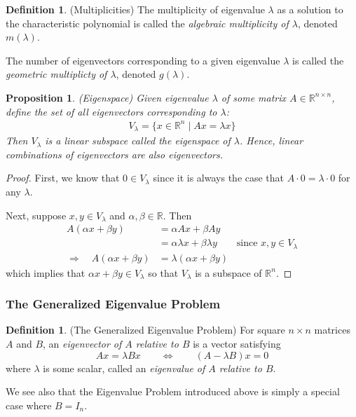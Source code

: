 \documentclass[12pt]{article}
\numberwithin{equation}{section} %
\theoremstyle{plain}
\newtheorem{prop}[thm]{Proposition}
\theoremstyle{definition}
\newtheorem{defn}[thm]{Definition}
\theoremstyle{remark}
\newcommand{\R}{\mathbb{R}}
\newcommand{\Rn}{\mathbb{R}^n}
\newcommand{\Rnn}{\mathbb{R}^{n\times n}}
\begin{document}
\begin{defn}{(Multiplicities)}
The multiplicity of eigenvalue $\lambda$ as a solution to the
characteristic polynomial is called the \emph{algebraic multiplicity of
$\lambda$}, denoted $m(\lambda)$.

The number of eigenvectors corresponding to a given eigenvalue $\lambda$
is called the \emph{geometric multiplicty of $\lambda$}, denoted
$g(\lambda)$.
\end{defn}

\begin{prop}{\emph{(Eigenspace)}}
Given eigenvalue $\lambda$ of some matrix $A\in\Rnn$, define the set of
all eigenvectors corresponding to $\lambda$:
\begin{align*}
  V_\lambda = \{ x\in \Rn \; | \; Ax = \lambda x \}
\end{align*}
Then $V_\lambda$ is a linear subspace called the \emph{eigenspace of
$\lambda$}. Hence, linear combinations of eigenvectors are also
eigenvectors.
\end{prop}
\begin{proof}
First, we know that $0\in V_\lambda$ since it is always the case that
$A\cdot 0=\lambda \cdot 0$ for any $\lambda$.

Next, suppose $x,y \in V_\lambda$ and $\alpha,\beta\in\R$. Then
\begin{align*}
  A(\alpha x + \beta y)
  &= \alpha Ax + \beta Ay \\
  &= \alpha \lambda x + \beta \lambda y
  \qquad \text{since $x,y\in V_\lambda$} \\
  \Rightarrow\quad
  A(\alpha x + \beta y)
  &= \lambda (\alpha x + \beta y)
\end{align*}
which implies that $\alpha x + \beta y \in V_\lambda$ so that
$V_\lambda$ is a subspace of $\Rn$.
\end{proof}


\subsubsection{The Generalized Eigenvalue Problem}

\begin{defn}{(The Generalized Eigenvalue Problem)}
For square $n\times n$ matrices $A$ and $B$, an \emph{eigenvector of
$A$ relative to $B$} is a vector satisfying
\begin{equation}
  Ax = \lambda B x
  \qquad \Leftrightarrow \qquad
  (A - \lambda B) x = 0
\end{equation}
where $\lambda$ is some scalar, called an \emph{eigenvalue of $A$
relative to $B$}.

We see also that the Eigenvalue Problem introduced above is simply a
special case where $B=I_n$.
\end{defn}
\end{document}
